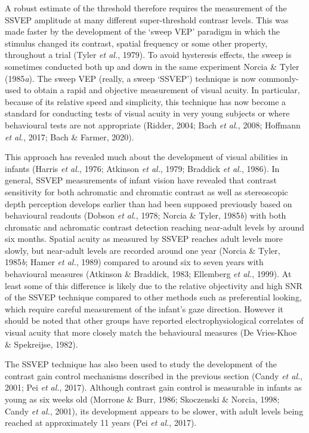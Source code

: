 \documentclass[
  letterpaper,
  DIV=11,
  numbers=noendperiod]{scrartcl}
\begin{document}
A robust estimate of the threshold therefore requires the measurement of
the SSVEP amplitude at many different super-threshold contrasr levels.
This was made faster by the development of the `sweep VEP' paradigm in
which the stimulus changed its contrast, spatial frequency or some other
property, throughout a trial (Tyler \emph{et al.}, 1979). To avoid
hysteresis effects, the sweep is sometimes conducted both up and down in
the same experiment Norcia \& Tyler (1985\emph{a}). The sweep VEP
(really, a sweep `SSVEP') technique is now commonly-used to obtain a
rapid and objective measurement of visual acuity. In particular, because
of its relative speed and simplicity, this technique has now become a
standard for conducting tests of visual acuity in very young subjects or
where behavioural tests are not appropriate (Ridder, 2004; Bach \emph{et
al.}, 2008; Hoffmann \emph{et al.}, 2017; Bach \& Farmer, 2020).

This approach has revealed much about the development of visual
abilities in infants (Harris \emph{et al.}, 1976; Atkinson \emph{et
al.}, 1979; Braddick \emph{et al.}, 1986). In general, SSVEP
measurements of infant vision have revealed that contrast sensitivity
for both achromatic and chromatic contrast as well as stereoscopic depth
perception develops earlier than had been supposed previously based on
behavioural readouts (Dobson \emph{et al.}, 1978; Norcia \& Tyler,
1985\emph{b}) with both chromatic and achromatic contrast detection
reaching near-adult levels by around six months. Spatial acuity as
measured by SSVEP reaches adult levels more slowly, but near-adult
levels are recorded around one year (Norcia \& Tyler, 1985\emph{b};
Hamer \emph{et al.}, 1989) compared to around six to seven years with
behavioural measures (Atkinson \& Braddick, 1983; Ellemberg \emph{et
al.}, 1999). At least some of this difference is likely due to the
relative objectivity and high SNR of the SSVEP technique compared to
other methods such as preferential looking, which require careful
measurement of the infant's gaze direction. However it should be noted
that other groups have reported electrophysiological correlates of
visual acuity that more closely match the behavioural measures (De
Vries-Khoe \& Spekreijse, 1982).

The SSVEP technique has also been used to study the development of the
contrast gain control mechanisms described in the previous section
(Candy \emph{et al.}, 2001; Pei \emph{et al.}, 2017). Although contrast
gain control is measurable in infants as young as six weeks old (Morrone
\& Burr, 1986; Skoczenski \& Norcia, 1998; Candy \emph{et al.}, 2001),
its development appears to be slower, with adult levels being reached at
approximately 11 years (Pei \emph{et al.}, 2017).
\end{document}
